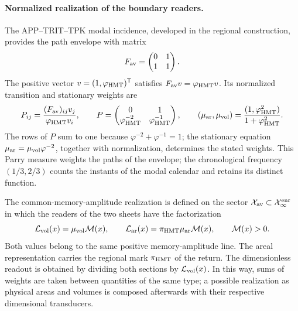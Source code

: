 \paragraph{Normalized realization of the boundary readers.}
The APP--TRIT--TPK modal incidence, developed in the regional
construction, provides the path envelope with matrix
\[
 F_{\rm av}=\begin{pmatrix}0&1\\1&1\end{pmatrix}.
\]
The positive vector \(v=(1,\varphi_{\rm HMT})^{\mathsf T}\)
satisfies \(F_{\rm av}v=\varphi_{\rm HMT}v\). Its normalized
transition and stationary weights are
\begin{equation}
 P_{ij}=\frac{(F_{\rm av})_{ij}v_j}{\varphi_{\rm HMT}v_i},
 \qquad
 P=\begin{pmatrix}0&1\\
 \varphi_{\rm HMT}^{-2}&\varphi_{\rm HMT}^{-1}\end{pmatrix},
 \qquad
 (\mu_{\rm ar},\mu_{\rm vol})
 =\frac{(1,\varphi_{\rm HMT}^{2})}{1+\varphi_{\rm HMT}^{2}}.
 \label{vii:eq:lectores-parry}
\end{equation}
The rows of \(P\) sum to one because
\(\varphi^{-2}+\varphi^{-1}=1\); the stationary equation
\(\mu_{\rm ar}=\mu_{\rm vol}\varphi^{-2}\), together with
normalization, determines the stated weights. This Parry measure
weights the paths of the envelope; the chronological frequency
\((1/3,2/3)\) counts the instants of the modal calendar and retains
its distinct function.

The common-memory-amplitude realization is defined on the sector
\(\mathcal X_{\rm av}\subset\mathcal X_\infty^{\rm enr}\) in which
the readers of the two sheets have the factorization
\begin{equation}
 \mathcal L_{\rm vol}(x)=\mu_{\rm vol}\mathcal M(x),\qquad
 \mathcal L_{\rm ar}(x)=\pi_{\rm HMT}\mu_{\rm ar}\mathcal M(x),
 \qquad \mathcal M(x)>0.
 \label{vii:eq:lectores-amplitud-comun}
\end{equation}
Both values belong to the same positive memory-amplitude
line. The areal representation carries the regional mark
\(\pi_{\rm HMT}\) of the return. The dimensionless readout is obtained
by dividing both sections by \(\mathcal L_{\rm vol}(x)\).
In this way, sums of weights are taken between quantities of the
same type; a possible realization as physical areas and volumes
is composed afterwards with their respective dimensional transducers.

